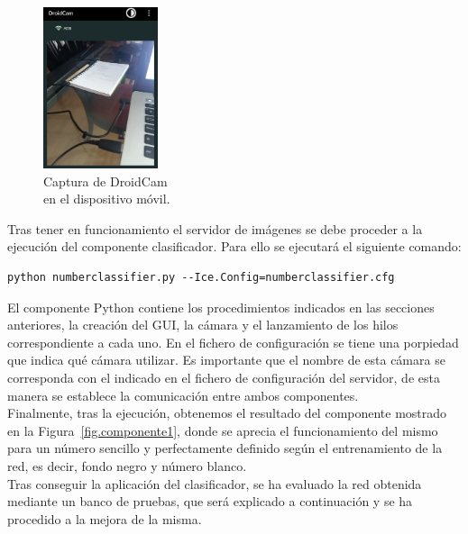 \begin{figure}[H]
	\begin{center}
		\includegraphics[width=0.3\textwidth]{figures/droidcamMov}
		\caption{Captura de DroidCam\\ 
			en el dispositivo móvil.}
		\label{fig.droidMov}
	\end{center}
\end{figure}

Tras tener en funcionamiento el servidor de imágenes se debe proceder a la ejecución del componente clasificador. Para ello se ejecutará el siguiente comando:
\vspace{10pt}
\begin{lstlisting}[frame=single]
	python numberclassifier.py --Ice.Config=numberclassifier.cfg
\end{lstlisting}

El componente Python contiene los procedimientos indicados en las secciones anteriores, la creación del GUI, la cámara y el lanzamiento de los hilos correspondiente a cada uno. En el fichero de configuración se tiene una porpiedad que indica qué cámara utilizar. Es importante que el nombre de esta cámara se corresponda con el indicado en el fichero de configuración del servidor, de esta manera se establece la comunicación entre ambos componentes.\\

Finalmente, tras la ejecución, obtenemos el resultado del componente mostrado en la Figura~\ref{fig.componente1}, donde se aprecia el funcionamiento del mismo para un número sencillo y perfectamente definido según el entrenamiento de la red, es decir, fondo negro y número blanco.\\

Tras conseguir la aplicación del clasificador, se ha evaluado la red obtenida mediante un banco de pruebas, que será explicado a continuación y se ha procedido a la mejora de la misma.

